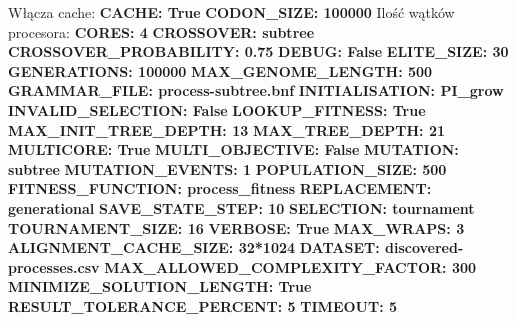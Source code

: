 Włącza cache: \newline
\textbf{CACHE:                         True} \newline
\textbf{CODON\_SIZE:                   100000} \newline
Ilość wątków procesora:
\textbf{CORES:                         4} \newline
\textbf{CROSSOVER:                     subtree} \newline
\textbf{CROSSOVER\_PROBABILITY:         0.75} \newline
\textbf{DEBUG:                         False} \newline
\textbf{ELITE\_SIZE:                   30} \newline
\textbf{GENERATIONS:                   100000} \newline
\textbf{MAX\_GENOME\_LENGTH:           500} \newline
\textbf{GRAMMAR\_FILE:                  process-subtree.bnf} \newline
\textbf{INITIALISATION:                 PI\_grow} \newline
\textbf{INVALID\_SELECTION:              False} \newline
\textbf{LOOKUP\_FITNESS:                 True} \newline
\textbf{MAX\_INIT\_TREE\_DEPTH:            13} \newline
\textbf{MAX\_TREE\_DEPTH:                 21} \newline
\textbf{MULTICORE:                      True} \newline
\textbf{MULTI\_OBJECTIVE:                False} \newline
\textbf{MUTATION:                       subtree} \newline
\textbf{MUTATION\_EVENTS:                1} \newline
\textbf{POPULATION\_SIZE:                500} \newline
\textbf{FITNESS\_FUNCTION:               process\_fitness} \newline
\textbf{REPLACEMENT:                    generational} \newline
\textbf{SAVE\_STATE\_STEP:                10} \newline
\textbf{SELECTION:                      tournament} \newline
\textbf{TOURNAMENT\_SIZE:                16} \newline
\textbf{VERBOSE:                        True} \newline
\textbf{MAX\_WRAPS:                      3} \newline
\textbf{ALIGNMENT\_CACHE\_SIZE:           32*1024} \newline
\textbf{DATASET:                        discovered-processes.csv} \newline
\textbf{MAX\_ALLOWED\_COMPLEXITY\_FACTOR:  300} \newline
\textbf{MINIMIZE\_SOLUTION\_LENGTH:       True} \newline
\textbf{RESULT\_TOLERANCE\_PERCENT:       5} \newline
\textbf{TIMEOUT:                        5} \newline

